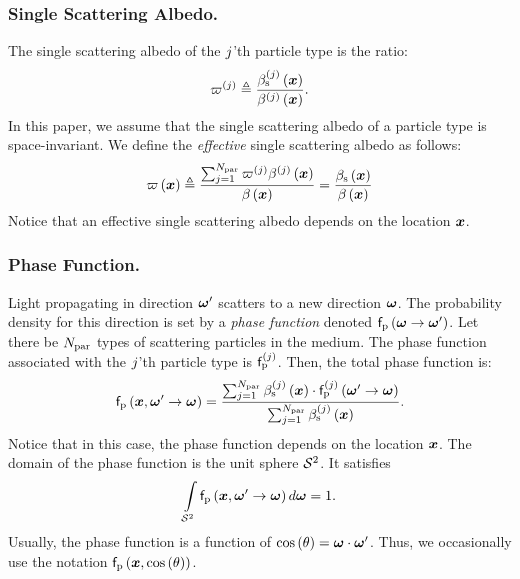 \documentclass{article}
\begin{document}
\subsubsection{Single Scattering Albedo.}
The single scattering albedo of the $j$'th particle type is the ratio:
\begin{equation}
\label{eq:sinscat}
\varpi^{\left({j}\right)} \triangleq \frac{\beta_{\text{s}}^{\left({j}\right)}\left({\boldsymbol{x}}\right)}{\beta^{\left({j}\right)}\left({\boldsymbol{x}}\right)}.
\end{equation}
In this paper, we assume that the single scattering albedo of a particle type is space-invariant. We define the {\em effective} single scattering albedo as follows:
\begin{equation}
\label{eq:eff_sinscat}
\sinscat \regpar{\location} \triangleq  \frac{\sum_{\ptype=1}^{\Npar}{\sinscatpar{\ptype}\extt^{\regpar{\ptype}}\regpar{\location}}}{\exttat} = %
\frac{\extsat}{\exttat} 
\end{equation}
Notice that an effective single scattering albedo depends on the location $\boldsymbol{x}$.

\subsubsection{Phase Function.}
Light propagating in direction $\boldsymbol{\omega}'$ scatters to a new direction $\boldsymbol{\omega}$. The probability density for this direction is set by a {\em phase function} denoted $\mathsf{f}_{\text{p}}\left({\boldsymbol{\omega}\rightarrow\boldsymbol{\omega}'}\right)$. Let there be $N_{\text{par}}$ types of scattering particles in the medium. The phase function associated with the $j$'th particle type is $\mathsf{f}_{\text{p}}^{\left({j}\right)}$. Then, the total phase function is:
\begin{equation}
\label{eq:phasefunc_particles}
\mathsf{f}_{\text{p}}\left({\boldsymbol{x}, \boldsymbol{\omega}'\rightarrow \boldsymbol{\omega}}\right)=\frac{\sum_{j=1}^{N_{\text{par}}}{\beta_{\text{s}}^{\left({j}\right)}\left({\boldsymbol{x}}\right)\cdot \mathsf{f}_{\text{p}}^{\left({j}\right)}\left({\boldsymbol{\omega}'\rightarrow\boldsymbol{\omega}}\right)}}{\sum_{j=1}^{N_{\text{par}}}{\beta_{\text{s}}^{\left({j}\right)}\left({\boldsymbol{x}}\right)}} .
\end{equation}
Notice that in this case, the phase function depends on the location $\boldsymbol{x}$. The domain of the phase function is the unit sphere $\mathcal{S}^2$. It satisfies
\begin{equation}
\label{eq:phase_conservation}
\intop_{\sphere} \phasefunc\regpar{\location, \direction'\rightarrow\direction} d\direction = 1.
\end{equation}
Usually, the phase function is a function of $\cos\left({\theta}\right)=\boldsymbol{\omega}\cdot\boldsymbol{\omega}'$. Thus, we occasionally use the notation $\mathsf{f}_{\text{p}}\left({\boldsymbol{x}, \cos\left({\theta}\right)}\right)$.
\end{document}

